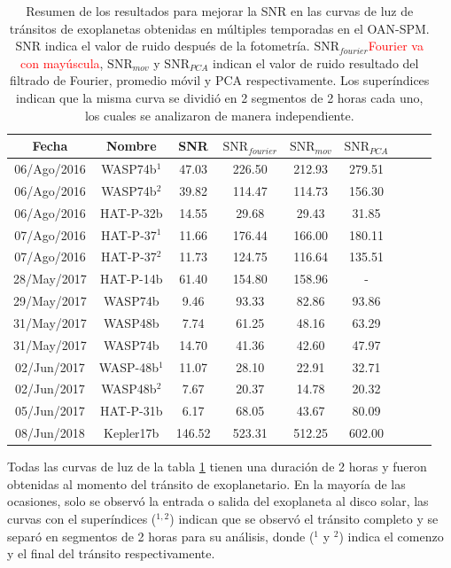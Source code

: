 \begin{table}
	\centering
	\begin{footnotesize}
	\begin{tabular}{ccccccccc}
	\hline 
	Fecha & Nombre & SNR & $\mbox{SNR}_{fourier}$ &  $\mbox{SNR}_{mov}$ & $\mbox{SNR}_{PCA}$\\ 
	\hline
	06/Ago/2016 & WASP74b$^{1}$ & 47.03 & 226.50 & 212.93 & 279.51 \\ 
	06/Ago/2016 & WASP74b$^{2}$ & 39.82 & 114.47 & 114.73 & 156.30 \\
	06/Ago/2016 & HAT-P-32b & 14.55 & 29.68 & 29.43 & 31.85 \\
	07/Ago/2016 & HAT-P-37$^{1}$ & 11.66 & 176.44 & 166.00 & 180.11 \\ 
	07/Ago/2016 & HAT-P-37$^{2}$ & 11.73 & 124.75 & 116.64 & 135.51 \\ 
	28/May/2017 & HAT-P-14b & 61.40 & 154.80 & 158.96 & - \\ 
	29/May/2017 & WASP74b & 9.46 & 93.33 & 82.86 & 93.86 \\
	31/May/2017 & WASP48b & 7.74 & 61.25 & 48.16 & 63.29 \\  
	31/May/2017 & WASP74b & 14.70 & 41.36 & 42.60 & 47.97 \\
	02/Jun/2017 & WASP-48b$^{1}$ & 11.07 & 28.10 & 22.91 & 32.71 \\
	02/Jun/2017 & WASP48b$^{2}$ & 7.67 & 20.37 & 14.78 & 20.32 \\
	05/Jun/2017 & HAT-P-31b & 6.17 & 68.05 & 43.67 & 80.09 \\
	08/Jun/2018 & Kepler17b & 146.52 & 523.31 & 512.25 & 602.00 \\ 
	\hline 
	\end{tabular} 
	\end{footnotesize}
	\caption{Resumen de los resultados para mejorar la SNR en las curvas de luz de tránsitos de exoplanetas obtenidas en múltiples temporadas en el OAN-SPM. SNR indica el valor de ruido después de la fotometría. $\mbox{SNR}_{fourier}$\textcolor{red}{Fourier va con mayúscula}, $\mbox{SNR}_{mov}$ y $\mbox{SNR}_{PCA}$ indican el valor de ruido resultado del filtrado de Fourier, promedio móvil y PCA respectivamente. Los superíndices indican que la misma curva se dividió en 2 segmentos de 2 horas cada uno, los cuales se analizaron de manera independiente.}
	\label{tab_4_1_resultados}
	\end{table}

Todas las curvas de luz de la tabla \ref{tab_4_1_resultados} tienen una duración de 2 horas y fueron obtenidas al momento del tránsito de exoplanetario. En la mayoría de las ocasiones, solo se observó la entrada o salida del exoplaneta al disco solar, las curvas con el superíndices ($^{1,2}$) indican que se observó el tránsito completo y se separó en segmentos de 2 horas para su análisis, donde ($^{1}$ y $^{2}$) indica el comenzo y el final del tránsito respectivamente.

